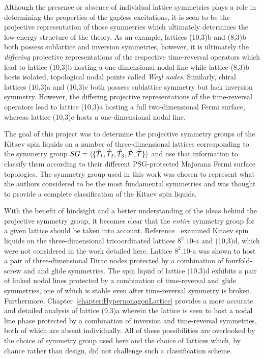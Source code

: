 Although the presence or absence of individual lattice symmetries plays a role in determining the properties of the gapless excitations, it is seen to be the projective representation of those symmetries which ultimately determines the low-energy structure of the theory.
As an example, lattices (10,3)b and (8,3)b both possess sublattice and inversion symmetries, however, it is ultimately the \textit{differing} projective representations of the respective time-reversal operators which lead to lattice (10,3)b hosting a one-dimensional nodal line while lattice (8,3)b hosts isolated, topological nodal points called \textit{Weyl nodes}.
Similarly, chiral lattices (10,3)a and (10,3)c both possess sublattice symmetry but lack inversion symmetry.
However, the differing projective representations of the time-reversal operators lead to lattice (10,3)a hosting a full two-dimensional Fermi surface, whereas lattice (10,3)c hosts a one-dimensional nodal line.

The goal of this project was to determine the projective symmetry groups of the Kitaev spin liquids on a number of three-dimensional lattices corresponding to the symmetry group $SG = \langle \{ \hat{T}_1, \hat{T}_2, \hat{T}_3, \hat{\mathcal{P}}, \hat{\mathcal{T}} \} \rangle$ and use that information to classify them according to their different PSG-protected Majorana Fermi surface topologies.
The symmetry group used in this work was chosen to represent what the authors considered to be the most fundamental symmetries and was thought to provide a complete classification of the Kitaev spin liquids.

With the benefit of hindsight and a better understanding of the ideas behind the projective symmetry group, it becomes clear that the \textit{entire} symmetry group for a given lattice should be taken into account.
Reference~\cite{YamadaPRB2017} examined Kitaev spin liquids on the three-dimensional tricoordinated lattices $8^{2}.10$-a and (10,3)d, which were not considered in the work detailed here.
Lattice $8^{2}.10$-a was shown to host a pair of three-dimensional Dirac nodes protected by a combination of fourfold-screw and and glide symmetries.
The spin liquid of lattice (10,3)d exhibits a pair of linked nodal lines protected by a combination of time-reversal and glide symmetries, one of which is stable even after time-reversal symmetry is broken.
Furthermore, Chapter~\ref{chapter:HypernonagonLattice} provides a more accurate and detailed analysis of lattice (9,3)a wherein the lattice is seen to host a nodal line phase protected by a combination of inversion and time-reversal symmetries, both of which are absent individually.
All of these possibilities are overlooked by the choice of symmetry group used here and the choice of lattices which, by chance rather than design, did not challenge such a classification scheme.

